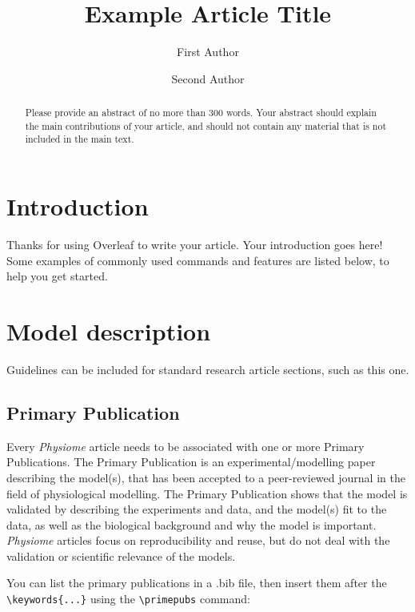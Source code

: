 \documentclass[fleqn,10pt]{physiome}
\title{Example Article Title}
\author[1][corr.author@xyz.ac.mm]{First Author}
\author[2]{Second Author}
\affil[1]{Address of first author}
\affil[2]{Address of second author}
\begin{document}
\maketitle

\begin{abstract}
Please provide an abstract of no more than 300 words. Your abstract should explain the main contributions of your article, and should not contain any material that is not included in the main text. 
\end{abstract}



\section{Introduction}

Thanks for using Overleaf to write your article. Your introduction goes here! Some examples of commonly used commands and features are listed below, to help you get started.

\section{Model description}

Guidelines can be included for standard research article sections, such as this one. 

\subsection{Primary Publication}

Every \emph{Physiome} article needs to be associated with one or more Primary Publications. The Primary Publication is an experimental/modelling paper describing the model(s), that has been accepted to a peer-reviewed journal in the field of physiological modelling. The Primary Publication shows that the model is validated by describing the experiments and data, and the model(s) fit to the data, as well as the biological background and why the model is important.
\emph{Physiome} articles focus on reproducibility and reuse, but do not deal with the validation or scientific relevance of the models.

You can list the primary publications in a .bib file, then insert them after the \verb|\keywords{...}| using the \verb|\primepubs| command:
\end{document}
